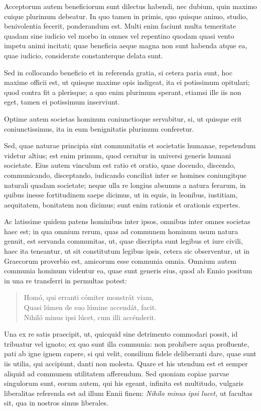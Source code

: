  

 Acceptorum autem beneficiorum sunt dilectus habendi, nec dubium, quin maximo cuique plurimum debeatur. In quo tamen in primis, quo quisque animo, studio, benivolentia fecerit, ponderandum est. Multi enim faciunt multa temeritate quadam sine iudicio vel morbo in omnes vel repentino quodam quasi vento impetu animi incitati; quae beneficia aeque magna non sunt habenda atque ea, quae iudicio, considerate constanterque delata sunt.

Sed in collocando beneficio et in referenda gratia, si cetera paria sunt, hoc maxime officii est, ut quisque maxime opis indigeat, ita ei potissimum opitulari; quod contra fit a plerisque; a quo enim plurimum sperant, etiamsi ille iis non eget, tamen ei potissimum inserviunt.
 

 Optime autem societas hominum coniunctioque servabitur, si, ut quisque erit coniunctissimus, ita in eum benignitatis plurimum conferetur.


Sed, quae naturae principia sint communitatis et societatis humanae, repetendum videtur altius; est enim primum, quod cernitur in universi generis humani societate. Eius autem vinculum est ratio et oratio, quae docendo, discendo, communicando, disceptando, iudicando conciliat inter se homines coniungitque naturali quadam societate; neque ulla re longius absumus a natura ferarum, in quibus inesse fortitudinem saepe dicimus, ut in equis, in leonibus, iustitiam, aequitatem, bonitatem non dicimus; sunt enim rationis et orationis expertes.

 Ac latissime quidem patens hominibus inter ipsos, omnibus inter omnes societas haec est; in qua omnium rerum, quas ad communem hominum usum natura genuit, est servanda communitas, ut, quae discripta sunt legibus et iure civili, haec ita teneantur, ut sit constitutum legibus ipsis, cetera sic observentur, ut in Graecorum proverbio est, amicorum esse communia omnia. Omnium autem communia hominum videntur ea, quae sunt generis eius, quod ab Ennio positum in una re transferri in permultas potest:
\begin{verse}
Homó, qui erranti cómiter monstrát viam,\\
Quasi lúmen de suo lúmine accendát, facit.\\
Nihiló minus ipsi lúcet, cum illi accénderit.\\
\end{verse}
Una ex re satis praecipit, ut, quicquid sine detrimento commodari possit, id tribuatur vel ignoto;  ex quo sunt illa communia: non prohibere aqua profluente, pati ab igne ignem capere, si qui velit, consilium fidele deliberanti dare, quae sunt iis utilia, qui accipiunt, danti non molesta. Quare et his utendum est et semper aliquid ad communem utilitatem afferendum. Sed quoniam copiae parvae singulorum sunt, eorum autem, qui his egeant, infinita est multitudo, vulgaris liberalitas referenda est ad illum Ennii finem: \textit{Nihilo minus ipsi lucet,} ut facultas sit, qua in nostros simus liberales.


